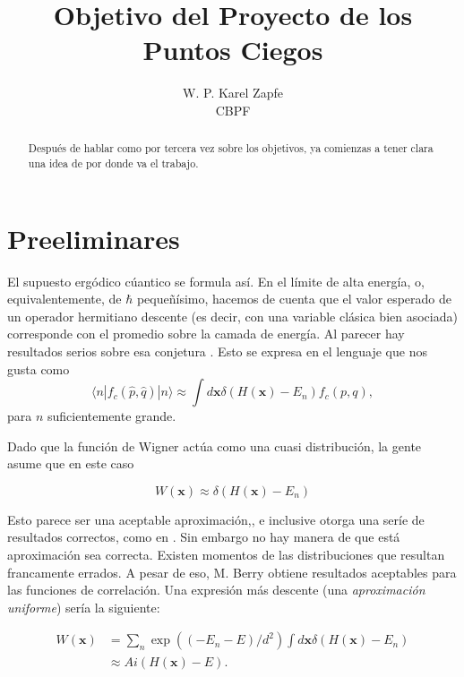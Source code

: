 \documentclass[a4paper,10pt]{article}
\title{Objetivo del Proyecto de los Puntos Ciegos}
\author{ W. P. Karel Zapfe\\CBPF}
\newcommand{\xfase}{\mathbf{x}}
\newcommand{\bra}[1]{\langle #1|}
\newcommand{\ket}[1]{|#1\rangle}
\begin{document}
\maketitle

\begin{abstract}

Después de hablar como por tercera vez sobre los objetivos,
ya comienzas a tener clara una idea de por donde va el trabajo.

\end{abstract}

\section{Preeliminares}

El supuesto ergódico cúantico se formula así. En el límite de alta energía,
o, equivalentemente, de $\hbar$ pequeñísimo, hacemos de cuenta
que el valor esperado de un operador hermitiano descente (es decir,
con una variable clásica bien asociada) corresponde con el promedio
sobre la camada de energía. Al parecer hay resultados serios sobre esa
conjetura \cite{Zeldtich}. Esto se expresa en el lenguaje que nos gusta
como
\begin{equation}
  \bra{n}f_c(\hat{p},\hat{q}) \ket{n}\approx \int d\xfase 
\delta(H(\xfase)-E_n) f_c(p,q),
\end{equation}
para $n$ suficientemente grande. 

Dado que la función de Wigner actúa como una cuasi distribución,
la gente asume que en este caso 

\begin{equation}
W(\xfase)\approx \delta(H(\xfase)-E_n)
\end{equation}

Esto parece ser una aceptable aproximación,, e inclusive otorga 
una seríe de resultados correctos, como en \cite{Berry78}.
Sin embargo no hay manera de que está aproximación sea correcta.
Existen momentos de las distribuciones que resultan 
francamente errados. A pesar de eso, M. Berry obtiene resultados 
aceptables para las funciones de correlación.
Una expresión más descente (una \emph{aproximación uniforme}) sería
la siguiente:

\begin{equation}
\begin{split}
W(\xfase)&=\sum_n \exp((-E_n -E)/d^2) \int d\xfase \delta(H(\xfase)-E_n)\\
&\approx Ai(H(\xfase)-E).
\end{split}
\end{equation}
\end{document}
